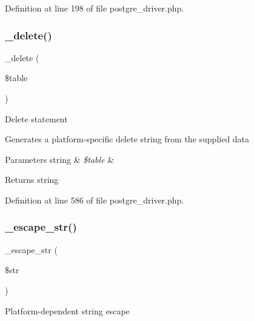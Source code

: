 Definition at line 198 of file postgre\+\_\+driver.\+php.

\mbox{\label{class_c_i___d_b__postgre__driver_a133ea8446ded52589bd22cc9163d0896}} 
\subsubsection{\texorpdfstring{\_delete()}{\_delete()}}
{\footnotesize\ttfamily \+\_\+delete (\begin{DoxyParamCaption}\item[{}]{\$table }\end{DoxyParamCaption})\hspace{0.3cm}{\ttfamily [protected]}}

Delete statement

Generates a platform-\/specific delete string from the supplied data


\begin{DoxyParams}[1]{Parameters}
string & {\em \$table} & \\
\hline
\end{DoxyParams}
\begin{DoxyReturn}{Returns}
string 
\end{DoxyReturn}


Definition at line 586 of file postgre\+\_\+driver.\+php.

\mbox{\label{class_c_i___d_b__postgre__driver_af8ef0237bfcdb19215b63fff769e7a55}} 
\subsubsection{\texorpdfstring{\_escape\_str()}{\_escape\_str()}}
{\footnotesize\ttfamily \+\_\+escape\+\_\+str (\begin{DoxyParamCaption}\item[{}]{\$str }\end{DoxyParamCaption})\hspace{0.3cm}{\ttfamily [protected]}}

Platform-\/dependent string escape


